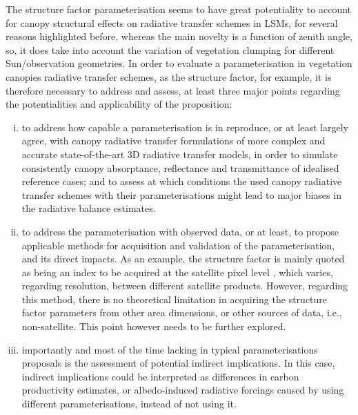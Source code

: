 The structure factor parameterisation \citep{pinty2006} seems to have great potentiality to account for canopy structural effects on radiative transfer schemes in LSMs, for several reasons highlighted before, whereas the main novelty is a function of zenith angle, so, it does take into account the variation of vegetation clumping for different Sun/observation geometries.
In order to evaluate a parameterisation in vegetation canopies radiative transfer schemes, as the structure factor, for example, it is therefore necessary to address and assess, at least three major points regarding the potentialities and applicability of the proposition: 
\begin{enumerate}[(i)]
\item to address how capable a parameterisation is in reproduce, or at least largely agree, with canopy radiative transfer formulations of more complex and accurate state-of-the-art 3D radiative transfer models, in order to simulate consistently canopy absorptance, reflectance and transmittance of idealised reference cases; and to assess at which conditions the used canopy radiative transfer schemes with  their parameterisations might lead to major biases in the radiative balance estimates.
\item to address the parameterisation with observed data, or at least, to propose applicable methods for acquisition and validation of the parameterisation, and its direct impacts. As an example, the structure factor is mainly quoted as being an index to be acquired at the satellite pixel level \citep{Pinty2004}, which varies, regarding resolution, between different satellite products. However, regarding this method, there is no theoretical limitation in acquiring the structure factor parameters from other area dimensions, or other sources of data, i.e., non-satellite. This point however needs to be further explored.
\item importantly and most of the time lacking in typical parameterisations proposals is the assessment of potential indirect implications. In this case, indirect implications could be interpreted as differences in carbon productivity estimates, or albedo-induced radiative forcings caused by using different parameterisations, instead of not using it.
\end{enumerate}


